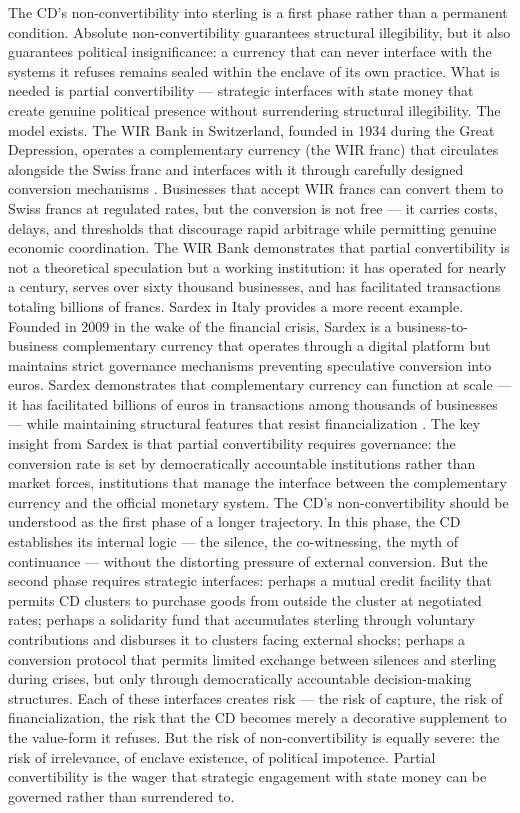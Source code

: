 The CD’s non-convertibility into sterling is a first phase rather than a permanent condition. Absolute non-convertibility guarantees structural illegibility, but it also guarantees political insignificance: a currency that can never interface with the systems it refuses remains sealed within the enclave of its own practice. What is needed is partial convertibility — strategic interfaces with state money that create genuine political presence without surrendering structural illegibility. The model exists. The WIR Bank in Switzerland, founded in 1934 during the Great Depression, operates a complementary currency (the WIR franc) that circulates alongside the Swiss franc and interfaces with it through carefully designed conversion mechanisms \cite{stodder_2009}. Businesses that accept WIR francs can convert them to Swiss francs at regulated rates, but the conversion is not free — it carries costs, delays, and thresholds that discourage rapid arbitrage while permitting genuine economic coordination. The WIR Bank demonstrates that partial convertibility is not a theoretical speculation but a working institution: it has operated for nearly a century, serves over sixty thousand businesses, and has facilitated transactions totaling billions of francs. Sardex in Italy provides a more recent example. Founded in 2009 in the wake of the financial crisis, Sardex is a business-to-business complementary currency that operates through a digital platform but maintains strict governance mechanisms preventing speculative conversion into euros. Sardex demonstrates that complementary currency can function at scale — it has facilitated billions of euros in transactions among thousands of businesses — while maintaining structural features that resist financialization \cite{dini_kioupkiolis_2019}. The key insight from Sardex is that partial convertibility requires governance: the conversion rate is set by democratically accountable institutions rather than market forces, institutions that manage the interface between the complementary currency and the official monetary system. The CD’s non-convertibility should be understood as the first phase of a longer trajectory. In this phase, the CD establishes its internal logic — the silence, the co-witnessing, the myth of continuance — without the distorting pressure of external conversion. But the second phase requires strategic interfaces: perhaps a mutual credit facility that permits CD clusters to purchase goods from outside the cluster at negotiated rates; perhaps a solidarity fund that accumulates sterling through voluntary contributions and disburses it to clusters facing external shocks; perhaps a conversion protocol that permits limited exchange between silences and sterling during crises, but only through democratically accountable decision-making structures. Each of these interfaces creates risk — the risk of capture, the risk of financialization, the risk that the CD becomes merely a decorative supplement to the value-form it refuses. But the risk of non-convertibility is equally severe: the risk of irrelevance, of enclave existence, of political impotence. Partial convertibility is the wager that strategic engagement with state money can be governed rather than surrendered to.

